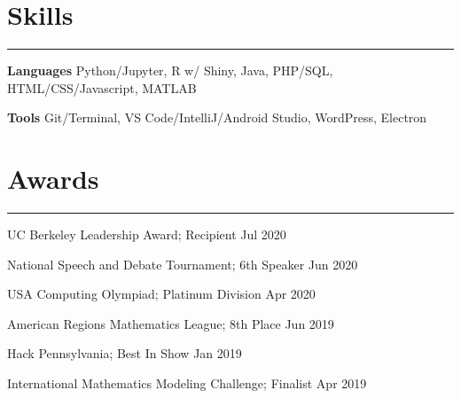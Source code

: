 \documentclass[11pt]{article}
\newcommand{\resumesection}[1]{\vspace{-0.3cm}\section*{\color{highlight}#1}\vspace{-0.3cm}\hrule\vspace{0.3cm}}
\begin{document}
\resumesection{Skills}

\textbf{Languages} Python/Jupyter, R w/ Shiny, Java, PHP/SQL, HTML/CSS/Javascript, MATLAB\par
\textbf{Tools} Git/Terminal, VS Code/IntelliJ/Android Studio, WordPress, Electron

\resumesection{Awards}

UC Berkeley Leadership Award; Recipient \hfill Jul 2020 \par
National Speech and Debate Tournament; 6th Speaker \hfill Jun 2020\par
USA Computing Olympiad; Platinum Division \hfill Apr 2020 \par
American Regions Mathematics League; 8th Place \hfill Jun 2019 \par
Hack Pennsylvania; Best In Show \hfill Jan 2019 \par
International Mathematics Modeling Challenge; Finalist \hfill Apr 2019\par
\end{document}
